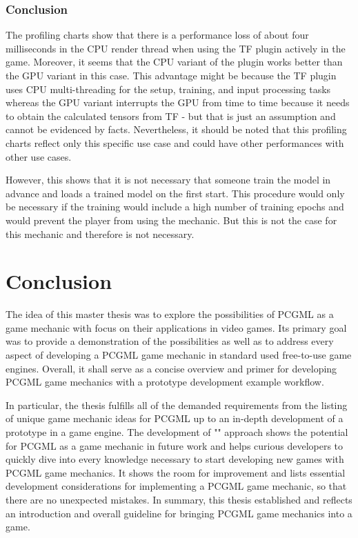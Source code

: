 \documentclass[MGS,Master,english]{twbook}%
\begin{document}
\subsection{Conclusion}
The profiling charts show that there is a performance loss of about four milliseconds in the CPU render thread when using the TF plugin actively in the game. Moreover, it seems that the CPU variant of the plugin works better than the GPU variant in this case. This advantage might be because the TF plugin uses CPU multi-threading for the setup, training, and input processing tasks whereas the GPU variant interrupts the GPU from time to time because it needs to obtain the calculated tensors from TF - but that is just an assumption and cannot be evidenced by facts. Nevertheless, it should be noted that this profiling charts reflect only this specific use case and could have other performances with other use cases. 

However, this shows that it is not necessary that someone train the model in advance and loads a trained model on the first start. This procedure would only be necessary if the training would include a high number of training epochs and would prevent the player from using the mechanic. But this is not the case for this mechanic and therefore is not necessary.

%
%
\clearpage
\chapter{Conclusion}
The idea of this master thesis was to explore the possibilities of PCGML as a game mechanic with focus on their applications in video games. Its primary goal was to provide a demonstration of the possibilities as well as to address every aspect of developing a PCGML game mechanic in standard used free-to-use game engines. Overall, it shall serve as a concise overview and primer for developing PCGML game mechanics with a prototype development example workflow.

In particular, the thesis fulfills all of the demanded requirements from the listing of unique game mechanic ideas for PCGML up to an in-depth development of a prototype in a game engine. The development of "" approach shows the potential for PCGML as a game mechanic in future work and helps curious developers to quickly dive into every knowledge necessary to start developing new games with PCGML game mechanics. It shows the room for improvement and lists essential development considerations for implementing a PCGML game mechanic, so that there are no unexpected mistakes. In summary, this thesis established and reflects an introduction and overall guideline for bringing PCGML game mechanics into a game.
\end{document}
